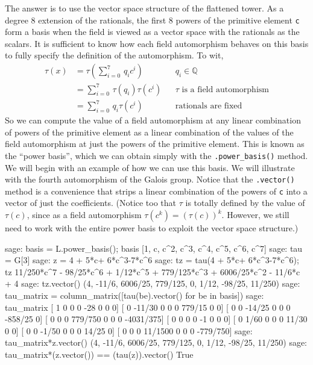 %
The answer is to use the vector space structure of the flattened tower.  As a degree 8 extension of the rationals, the first 8 powers of the primitive element \verb?c? form a basis when the field is viewed as a vector space with the rationals as the scalars.  It is sufficient to know how each field automorphism behaves on this basis to fully specify the definition of the automorphism.  To wit,
%
\begin{align*}
\tau(x)
&=\tau\left(\sum_{i=0}^7\,q_ic^i\right)&&q_i\in{\mathbb Q}\\
&=\sum_{i=0}^7\,\tau(q_i)\tau(c^i)&&\tau\text{ is a field automorphism}\\
&=\sum_{i=0}^7\,q_i\tau(c^i)&&\text{rationals are fixed}
\end{align*}
%
So we can compute the value of a field automorphism at any linear combination of powers of the primitive element as a linear combination of the values of the field automorphism at just the powers of the primitive element.  This is known as the ``power basis'', which we can obtain simply with the \verb?.power_basis()? method.  We will begin with an example of how we can use this basis.  We will illustrate with the fourth automorphism of the Galois group.  Notice that the \verb?.vector()? method is a convenience that strips a linear combination of the powers of \verb?c? into a vector of just the coefficients.  (Notice too that $\tau$ is totally defined by the value of $\tau(c)$, since as a field automorphism $\tau(c^k)=(\tau(c))^k$.  However, we still need to work with the entire power basis to exploit the vector space structure.)
%
\begin{sageexample}
sage: basis = L.power_basis(); basis
[1, c, c^2, c^3, c^4, c^5, c^6, c^7]
sage: tau = G[3]
sage: z = 4 + 5*c+ 6*c^3-7*c^6
sage: tz = tau(4 + 5*c+ 6*c^3-7*c^6); tz
11/250*c^7 - 98/25*c^6 + 1/12*c^5 + 779/125*c^3 +
6006/25*c^2 - 11/6*c + 4
sage: tz.vector()
(4, -11/6, 6006/25, 779/125, 0, 1/12, -98/25, 11/250)
sage: tau_matrix = column_matrix([tau(be).vector() for be in basis])
sage: tau_matrix
[  1       0       0        0  -28       0        0          0]
[  0  -11/30       0        0    0  779/15        0          0]
[  0       0  -14/25        0    0       0  -858/25          0]
[  0       0       0  779/750    0       0        0  -4031/375]
[  0       0       0        0   -1       0        0          0]
[  0    1/60       0        0    0   11/30        0          0]
[  0       0   -1/50        0    0       0    14/25          0]
[  0       0       0  11/1500    0       0        0   -779/750]
sage: tau_matrix*z.vector()
(4, -11/6, 6006/25, 779/125, 0, 1/12, -98/25, 11/250)
sage: tau_matrix*(z.vector()) == (tau(z)).vector()
True
\end{sageexample}
